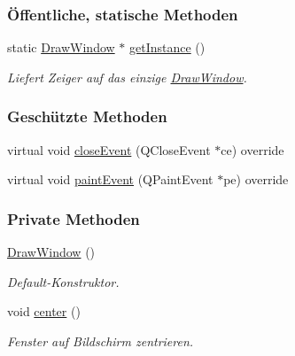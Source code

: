 \subsubsection*{Öffentliche, statische Methoden}
\begin{DoxyCompactItemize}
\item 
static \mbox{\hyperlink{classDrawWindow}{Draw\+Window}} $\ast$ \mbox{\hyperlink{classDrawWindow_ad6ccd97298af0331b99587071ba682de}{get\+Instance}} ()
\begin{DoxyCompactList}\small\item\em Liefert Zeiger auf das einzige \mbox{\hyperlink{classDrawWindow}{Draw\+Window}}. \end{DoxyCompactList}\end{DoxyCompactItemize}
\subsubsection*{Geschützte Methoden}
\begin{DoxyCompactItemize}
\item 
virtual void \mbox{\hyperlink{classDrawWindow_a453708daf7b29481a75fd6e20636f9fd}{close\+Event}} (Q\+Close\+Event $\ast$ce) override
\item 
virtual void \mbox{\hyperlink{classDrawWindow_ad3476b22727042cde867e0fff6f8f8fe}{paint\+Event}} (Q\+Paint\+Event $\ast$pe) override
\end{DoxyCompactItemize}
\subsubsection*{Private Methoden}
\begin{DoxyCompactItemize}
\item 
\mbox{\hyperlink{classDrawWindow_a6306ab8ed8304e89d1eb27a356e327a2}{Draw\+Window}} ()
\begin{DoxyCompactList}\small\item\em Default-\/\+Konstruktor. \end{DoxyCompactList}\item 
void \mbox{\hyperlink{classDrawWindow_ac0df14df2085f4bc7d19be0d3b44d2f7}{center}} ()
\begin{DoxyCompactList}\small\item\em Fenster auf Bildschirm zentrieren. \end{DoxyCompactList}\end{DoxyCompactItemize}

